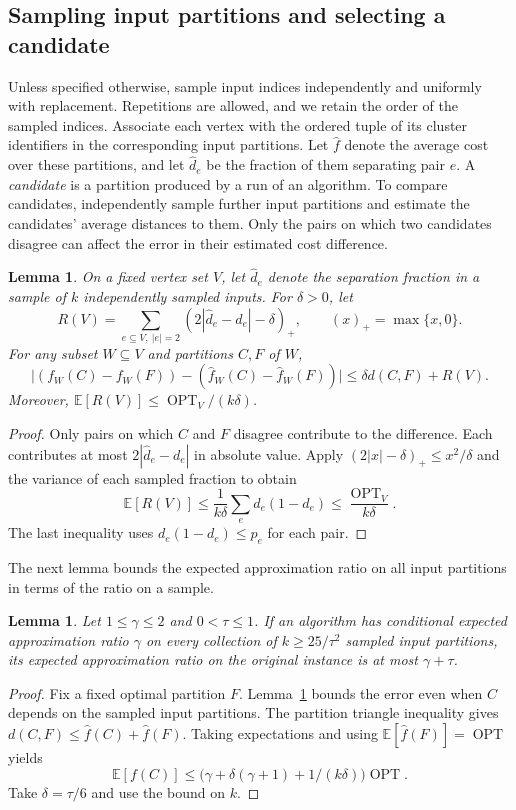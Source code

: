 \documentclass[11pt]{article}
\newtheorem{lemma}[theorem]{Lemma}
\begin{document}
\subsection{Sampling input partitions and selecting a candidate}
\label{sec:ensemble-transfer}

Unless specified otherwise, sample input indices independently and
uniformly with replacement. Repetitions are allowed, and we retain the
order of the sampled indices. Associate each vertex with the ordered tuple of its cluster identifiers
in the corresponding input partitions. Let
$\widehat f$ denote the average cost over these partitions, and let
$\widehat d_e$ be the fraction of them separating pair $e$. A
\emph{candidate} is a partition produced by a run of an algorithm.
To compare candidates, independently sample further input partitions
and estimate the candidates' average distances to them. Only the pairs
on which two candidates disagree can affect the error in their
estimated cost difference.

\begin{lemma}\label{lem:sample-difference}
On a fixed vertex set $V$, let $\widehat d_e$ denote the separation
fraction in a sample of $k$ independently sampled inputs. For $\delta>0$,
let
\[
 R(V)=\sum_{e\subseteq V,\ |e|=2}(2|\widehat d_e-d_e|-\delta)_+,
 \qquad (x)_+=\max\{x,0\}.
\]
For any subset $W\subseteq V$ and partitions $C,F$ of $W$,
\[
 \big|(f_W(C)-f_W(F))-(\widehat f_W(C)-\widehat f_W(F))\big|
 \le \delta d(C,F)+R(V).
\]
Moreover, $\mathbb E[R(V)]\le\operatorname{OPT}_V/(k\delta)$.
\end{lemma}
\begin{proof}
Only pairs on which $C$ and $F$ disagree contribute to the difference.
Each contributes at most $2|\widehat d_e-d_e|$ in absolute value.
Apply $(2|x|-\delta)_+\le x^2/\delta$ and the variance of each sampled
fraction to obtain
\[
 \mathbb E[R(V)]\le\frac{1}{k\delta}\sum_e d_e(1-d_e)
 \le\frac{\operatorname{OPT}_V}{k\delta}.
\]
The last inequality uses $d_e(1-d_e)\le p_e$ for each pair.
\end{proof}

The next lemma bounds the expected approximation ratio on all input
partitions in terms of the ratio on a sample.

\begin{lemma}\label{thm:ensemble-transfer}
Let $1\le\gamma\le2$ and $0<\tau\le1$. If an algorithm has conditional
expected approximation ratio $\gamma$ on every collection of
$k\ge25/\tau^2$ sampled input partitions, its expected approximation ratio on the original instance
is at most $\gamma+\tau$.
\end{lemma}
\begin{proof}
Fix a fixed optimal partition $F$. Lemma~\ref{lem:sample-difference} bounds the
error even when $C$ depends on the sampled input partitions. The partition triangle
inequality gives $d(C,F)\le\widehat f(C)+\widehat f(F)$.
Taking expectations and using $\mathbb E[\widehat f(F)]=\operatorname{OPT}$
yields
\[
 \mathbb E[f(C)]\le
 \bigl(\gamma+\delta(\gamma+1)+1/(k\delta)\bigr)\operatorname{OPT}.
\]
Take $\delta=\tau/6$ and use the bound on $k$.
\end{proof}
\end{document}
